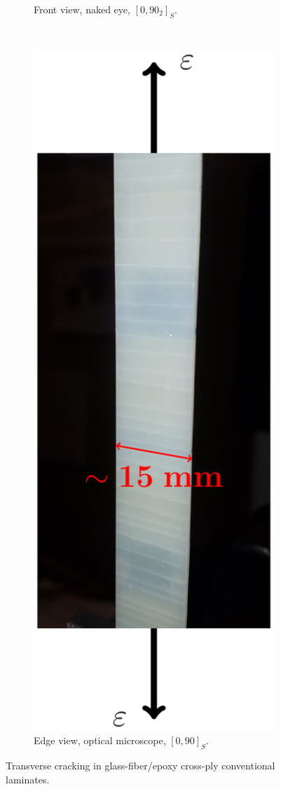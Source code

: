 \begin{figure}[!h]
\begin{subfigure}[b]{0.45\textwidth}
       \caption{Front view, naked eye, $\left[0,90_{2}\right]_{S}$.}
    \end{subfigure}
    ~
    \begin{subfigure}[b]{0.45\textwidth}
        \includegraphics[width=\textwidth]{pics/transversecracks-macro.pdf}
       \caption{Edge view, optical microscope, $\left[0,90\right]_{S}$.}
    \end{subfigure}

\caption{Transverse cracking in glass-fiber/epoxy cross-ply conventional laminates.}\label{intro:fig:transversecracks}
\end{figure}

